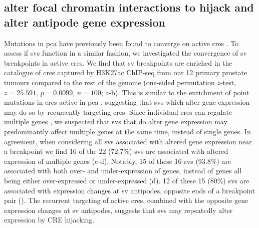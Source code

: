 \subsection{ alter focal chromatin interactions to hijack  and alter antipode gene expression}

Mutations in \gls{pca} have previously been found to converge on active \glspl{cre} \cite{mazrooeiCistromePartitioningReveals2019}.
To assess if \glspl{sv} function in a similar fashion, we investigated the convergence of \gls{sv} breakpoints in active \glspl{cre}.
We find that \gls{sv} breakpoints are enriched in the catalogue of \glspl{cre} captured by H3K27ac ChIP-seq from our 12 primary prostate tumours compared to the rest of the genome (one-sided permutation $z$-test, $z = 25.591$, $p = 0.0099$, $n = 100$; a-b).
This is similar to the enrichment of point mutations in \glspl{cre} active in \gls{pca} \cite{mazrooeiCistromePartitioningReveals2019}, suggesting that \glspl{sv} which alter gene expression may do so by recurrently targeting \glspl{cre}.
Since individual \glspl{cre} can regulate multiple genes \cite{gasperiniGenomewideFrameworkMapping2019}, we suspected that \glspl{sv} that do alter gene expression may predominantly affect multiple genes at the same time, instead of single genes.
In agreement, when considering all \glspl{sv} associated with altered gene expression near a breakpoint we find 16 of the 22 (72.7\%) \glspl{sv} are associated with altered expression of multiple genes (c-d).
Notably, 15 of these 16 \glspl{sv} (93.8\%) are associated with both over- and under-expression of genes, instead of genes all being either over-expressed or under-expressed (d).
12 of these 15 (80\%) \glspl{sv} are associated with expression changes at \gls{sv} antipodes, opposite ends of a breakpoint pair ().
The recurrent targeting of active \glspl{cre}, combined with the opposite gene expression changes at \gls{sv} antipodes, suggests that \glspl{sv} may repeatedly alter expression by CRE hijacking.


